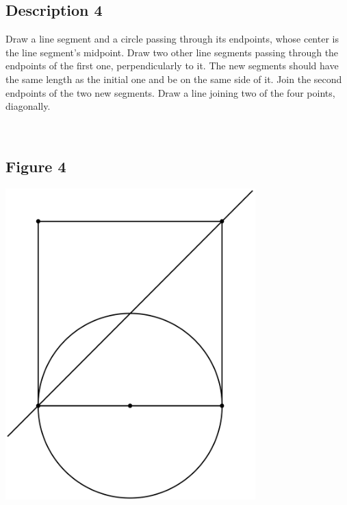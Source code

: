 \documentclass[12pt,a4paper,article,english,firamath]{nsi}
\begin{document}
\maketitle

\subsection*{Description 4}
{\brettley 

Draw a line segment and a circle passing through its endpoints, whose center is the line segment's midpoint.
Draw two other line segments passing through the endpoints of the first one, perpendicularly to it. The new segments should have the same length as the initial one and be on the same side of it. Join the second endpoints of the two new segments. Draw a line joining two of the four points, diagonally.}\\[1em]



\subsection*{Figure 4}
\begin{center}
    \includegraphics[height=12cm]{img/fig04.png}
\end{center}
\end{document}
